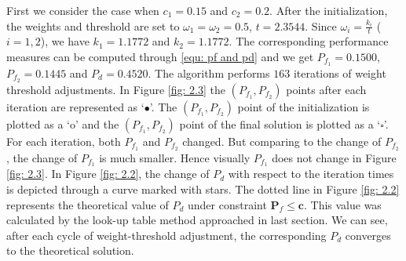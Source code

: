 First we consider the case when $c_1 = 0.15$ and $c_2 = 0.2$.
After the initialization, the weights and threshold are set to $\omega_1 = \omega_2 = 0.5$, $t =2.3544$. 
Since $\omega_i = \frac{k_i}{t}$ ($i = 1, 2$), we have $k_1 = 1.1772$ and $k_2 = 1.1772$. 
The corresponding performance measures can be computed through \eqref{equ: pf and pd} and we get $P_{f_1}  = 0.1500$, $P_{f_2} = 0.1445$ and $P_d = 0.4520$. The algorithm performs $163$ iterations of weight threshold adjustments. In Figure \ref{fig: 2.3} the $(P_{f_1}, P_{f_2})$  points after each iteration are represented as `$\bullet$'. 
The $(P_{f_1}, P_{f_2})$ point of the initialization is plotted as  a `o' and the $(P_{f_1}, P_{f_2})$ point of the final solution is plotted as a `$\square$'. For each iteration, both $P_{f_1}$ and $P_{f_2}$ changed. But comparing to the change of $P_{f_2}$, the change of $P_{f_1}$ is much smaller. Hence visually $P_{f_1} $ does not change in Figure \ref{fig: 2.3}. 
In Figure \ref{fig: 2.2}, the change of $P_d$ with respect to the iteration times is depicted through a curve marked with stars.   
The dotted line in Figure \ref{fig: 2.2} represents the theoretical value of $P_d$ under constraint $\mathbf{P}_f \leq \mathbf{c}$. This value was calculated by the look-up table method approached in last section. We can see, after each cycle of weight-threshold adjustment, the corresponding $P_d$ converges to the theoretical solution. 

